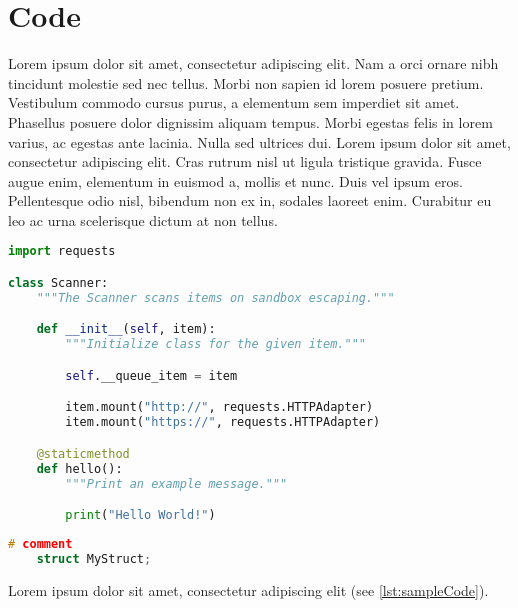 \chapter{Code}

Lorem ipsum dolor sit amet, consectetur adipiscing elit. Nam a orci ornare nibh tincidunt molestie sed nec tellus. Morbi non sapien id lorem posuere pretium. Vestibulum commodo cursus purus, a elementum sem imperdiet sit amet. Phasellus posuere dolor dignissim aliquam tempus. Morbi egestas felis in lorem varius, ac egestas ante lacinia. Nulla sed ultrices dui. Lorem ipsum dolor sit amet, consectetur adipiscing elit. Cras rutrum nisl ut ligula tristique gravida. Fusce augue enim, elementum in euismod a, mollis et nunc. Duis vel ipsum eros. Pellentesque odio nisl, bibendum non ex in, sodales laoreet enim. Curabitur eu leo ac urna scelerisque dictum at non tellus.

\begin{lstlisting}[caption={A sample Python listing},label={lst:sampleCode},language=Python]
import requests

class Scanner:
    """The Scanner scans items on sandbox escaping."""

    def __init__(self, item):
        """Initialize class for the given item."""

        self.__queue_item = item

        item.mount("http://", requests.HTTPAdapter)
        item.mount("https://", requests.HTTPAdapter)

    @staticmethod
    def hello():
    	"""Print an example message."""

    	print("Hello World!")
\end{lstlisting}

\begin{lstlisting}[caption={A sample Python listing 2},label={lst:sampleCode2},language=C++]
    # comment
    struct MyStruct;
\end{lstlisting}

Lorem ipsum dolor sit amet, consectetur adipiscing elit (see \ref{lst:sampleCode}).
